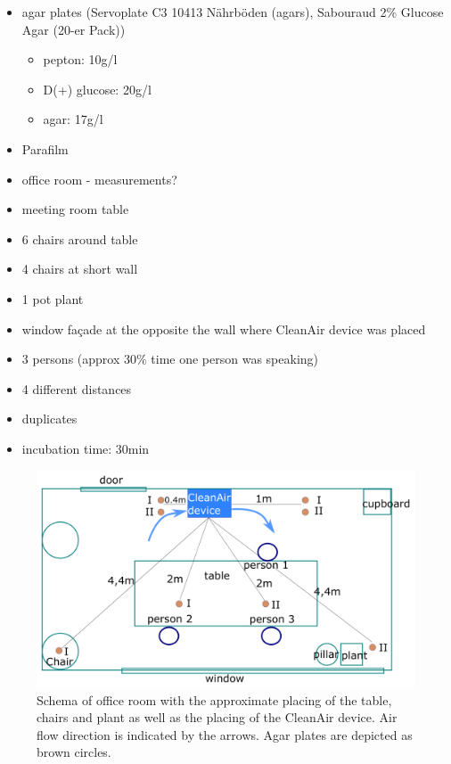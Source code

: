 \documentclass[hyperref]{labbook}
\begin{document}
\newpage
{}
\begin{itemize}
\item agar plates (Servoplate C3 10413 Nährböden (agars), Sabouraud 2\% Glucose Agar (20-er Pack))
\begin{itemize}
\item pepton: 10g/l
\item D(+) glucose: 20g/l
\item agar: 17g/l
\end{itemize}
\item Parafilm
\end{itemize}
\begin{itemize}
\item office room - measurements?
\item meeting room table 
\item 6 chairs around table
\item 4 chairs at short wall
\item 1 pot plant
\item window façade at the opposite the wall where CleanAir device was placed
\item 3 persons (approx 30\% time one person was speaking)
\end{itemize}
\begin{itemize}
\item 4 different distances
\item duplicates
\item incubation time: 30min
\end{itemize}
\begin{figure}[H]
\includegraphics[scale=0.28]{cleanair_experiment_schema3}
\caption{Schema of office room with the approximate placing of the table, chairs and plant as well as the placing of the CleanAir device. Air flow direction is indicated by the arrows. Agar plates are depicted as brown circles.}
\end{figure}
\end{document}

